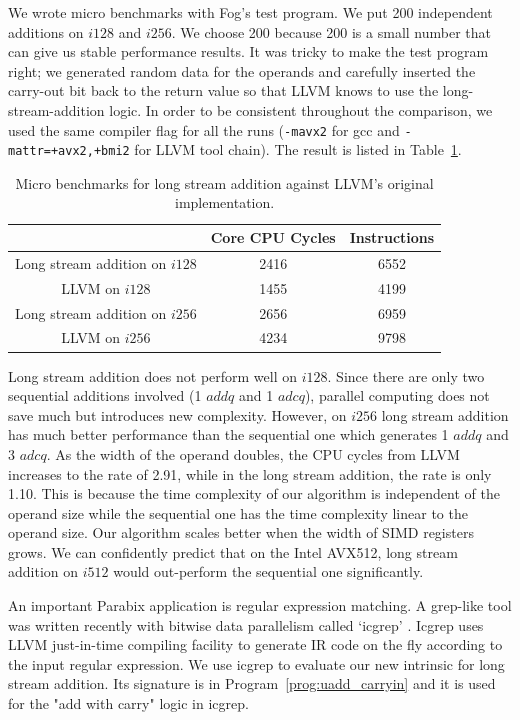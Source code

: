 We wrote micro benchmarks with Fog's test program. We put 200 independent additions on $i128$ and $i256$. We choose 200 because 200 is a small number that can give us stable performance results. It was tricky to make the test program right; we generated random data for the operands and carefully inserted the carry-out bit back to the return value so that LLVM knows to use the long-stream-addition logic. In order to be consistent throughout the comparison, we used the same compiler flag for all the runs ({\tt -mavx2} for gcc and {\tt -mattr=+avx2,+bmi2} for LLVM tool chain). The result is listed in Table~\ref{table:lsadd_micro}.

\begin{table}[h]
\centering
\begin{tabular}{|c|c|c|}
\hline
                             & Core CPU Cycles & Instructions \\ \hline
Long stream addition on $i128$ & 2416            & 6552         \\ \hline
LLVM on $i128$                 & 1455            & 4199         \\ \hline
Long stream addition on $i256$ & 2656            & 6959        \\ \hline
LLVM on $i256$                 & 4234            & 9798         \\ \hline
\end{tabular}
\caption{Micro benchmarks for long stream addition against LLVM's original implementation.}
\label{table:lsadd_micro}
\end{table}

Long stream addition does not perform well on $i128$. Since there are only two sequential additions involved (1 $addq$ and 1 $adcq$), parallel computing does not save much but introduces new complexity. However, on $i256$ long stream addition has much better performance than the sequential one which generates 1 $addq$ and 3 $adcq$. As the width of the operand doubles, the CPU cycles from LLVM increases to the rate of 2.91, while in the long stream addition, the rate is only 1.10. This is because the time complexity of our algorithm is independent of the operand size while the sequential one has the time complexity linear to the operand size. Our algorithm scales better when the width of SIMD registers grows. We can confidently predict that on the Intel AVX512, long stream addition on $i512$ would out-perform the sequential one significantly.

An important Parabix application is regular expression matching. A grep-like tool was written recently with bitwise data parallelism called `icgrep' \cite{dale_icgrep}. Icgrep uses LLVM just-in-time compiling facility to generate IR code on the fly according to the input regular expression. We use icgrep to evaluate our new intrinsic for long stream addition. Its signature is in Program~\ref{prog:uadd_carryin} and it is used for the "add with carry" logic in icgrep.

